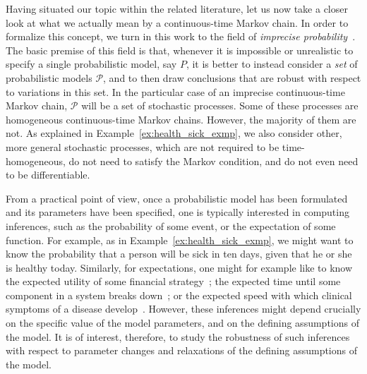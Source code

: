 \documentclass[10pt,a4paper]{paper}
\theoremstyle{definition}
\begin{document}







Having situated our topic within the related literature, let us now take a closer look at what we actually mean by a continuous-time Markov chain.
In order to formalize this concept, we turn in this work to the field of \emph{imprecise probability}~\cite{Walley:1991vk,troffaes2013:lp,augustin2013:itip}. The basic premise of this field is that, whenever it is impossible or unrealistic to specify a single probabilistic model, say $P$, it is better to instead consider a \emph{set} of probabilistic models $\mathcal{P}$, and to then draw conclusions that are robust with respect to variations in this set. In the particular case of an imprecise continuous-time Markov chain, $\mathcal{P}$ will be a set of stochastic processes. Some of these processes are homogeneous continuous-time Markov chains. However, the majority of them are not. As explained in Example~\ref{ex:health_sick_exmp}, we also consider other, more general stochastic processes, which are not required to be time-homogeneous, do not need to satisfy the Markov condition, and do not even need to be differentiable.


From a practical point of view, once a probabilistic model has been formulated and its parameters have been specified, one is typically interested in computing inferences, such as the probability of some event, or the expectation of some function. For example, as in Example~\ref{ex:health_sick_exmp}, we might want to know the probability that a person will be sick in ten days, given that he or she is healthy today.
Similarly, for expectations, one might for example like to know the expected utility of some financial strategy~\cite{sass2004optimizing}; the expected time until some component in a system breaks down~\cite{besnard2010approach}; or the expected speed with which clinical symptoms of a disease develop~\cite{duffy1995estimation}. However, these inferences might depend crucially on the specific value of the model parameters, and on the defining assumptions of the model.
It is of interest, therefore, to study the robustness of such inferences with respect to parameter changes and relaxations of the defining assumptions of the model.
\end{document}
